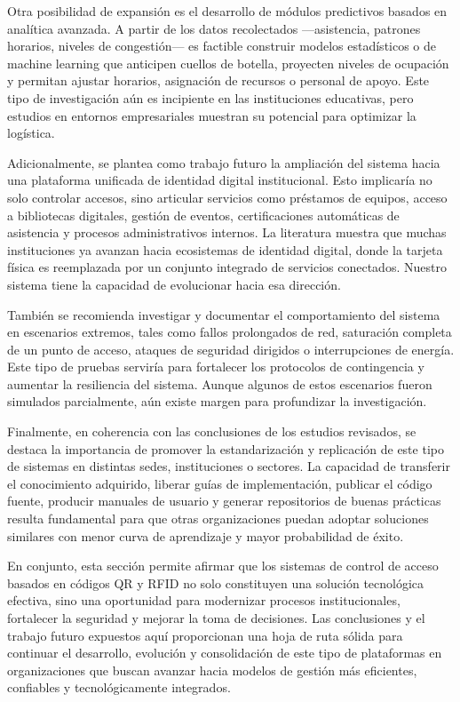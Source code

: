 Otra posibilidad de expansión es el desarrollo de módulos predictivos basados en analítica avanzada. A partir de los datos recolectados —asistencia, patrones horarios, niveles de congestión— es factible construir modelos estadísticos o de machine learning que anticipen cuellos de botella, proyecten niveles de ocupación y permitan ajustar horarios, asignación de recursos o personal de apoyo. Este tipo de investigación aún es incipiente en las instituciones educativas, pero estudios en entornos empresariales muestran su potencial para optimizar la logística.

Adicionalmente, se plantea como trabajo futuro la ampliación del sistema hacia una plataforma unificada de identidad digital institucional. Esto implicaría no solo controlar accesos, sino articular servicios como préstamos de equipos, acceso a bibliotecas digitales, gestión de eventos, certificaciones automáticas de asistencia y procesos administrativos internos. La literatura muestra que muchas instituciones ya avanzan hacia ecosistemas de identidad digital, donde la tarjeta física es reemplazada por un conjunto integrado de servicios conectados. Nuestro sistema tiene la capacidad de evolucionar hacia esa dirección.

También se recomienda investigar y documentar el comportamiento del sistema en escenarios extremos, tales como fallos prolongados de red, saturación completa de un punto de acceso, ataques de seguridad dirigidos o interrupciones de energía. Este tipo de pruebas serviría para fortalecer los protocolos de contingencia y aumentar la resiliencia del sistema. Aunque algunos de estos escenarios fueron simulados parcialmente, aún existe margen para profundizar la investigación.

Finalmente, en coherencia con las conclusiones de los estudios revisados, se destaca la importancia de promover la estandarización y replicación de este tipo de sistemas en distintas sedes, instituciones o sectores. La capacidad de transferir el conocimiento adquirido, liberar guías de implementación, publicar el código fuente, producir manuales de usuario y generar repositorios de buenas prácticas resulta fundamental para que otras organizaciones puedan adoptar soluciones similares con menor curva de aprendizaje y mayor probabilidad de éxito.

En conjunto, esta sección permite afirmar que los sistemas de control de acceso basados en códigos QR y RFID no solo constituyen una solución tecnológica efectiva, sino una oportunidad para modernizar procesos institucionales, fortalecer la seguridad y mejorar la toma de decisiones. Las conclusiones y el trabajo futuro expuestos aquí proporcionan una hoja de ruta sólida para continuar el desarrollo, evolución y consolidación de este tipo de plataformas en organizaciones que buscan avanzar hacia modelos de gestión más eficientes, confiables y tecnológicamente integrados.

